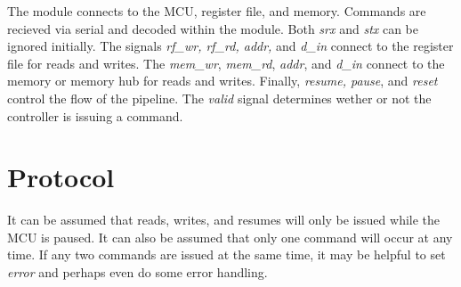 \documentclass[10pt,a4paper]{article}
\begin{document}
The module connects to the MCU, register file, and memory. Commands are recieved via serial and
decoded within the module. Both \emph{srx} and \emph{stx} can be ignored initially. The signals \emph{rf\_wr, rf\_rd, addr,} and
\emph{d\_in} connect to the register file for reads and writes. The \emph{mem\_wr}, \emph{mem\_rd},
\emph{addr}, and \emph{d\_in} connect to the memory or memory hub for reads and writes. Finally,
\emph{resume, pause}, and \emph{reset} control the flow of the pipeline. The \emph{valid} signal
determines wether or not the controller is issuing a command.

\newpage
\section{Protocol}

It can be assumed that reads, writes, and resumes will only be issued while the MCU is paused. It
can also be assumed that only one command will occur at any time. If any two commands are issued at the
same time, it may be helpful to set \emph{error} and perhaps even do some error handling.
\end{document}
